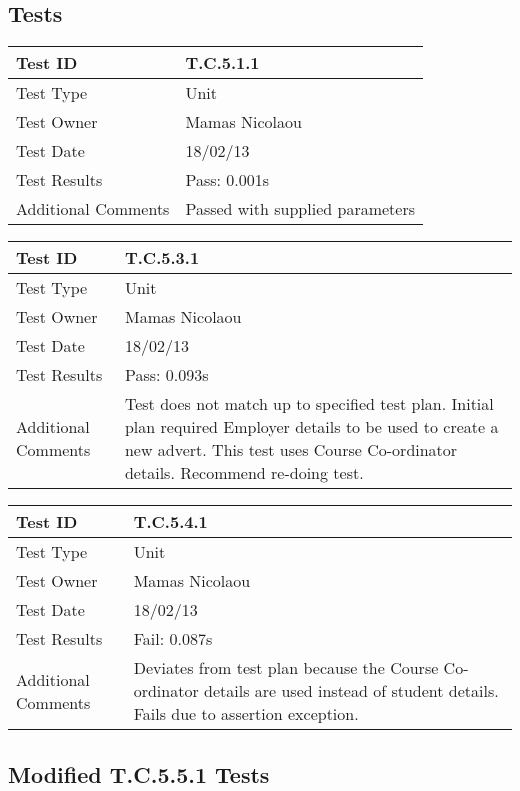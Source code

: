 \documentclass{l3deliverable}
\begin{document}
\subsection{Tests}

\begin{tabular}{|p{2cm}|p{12cm}|}
\hline
Test ID & T.C.5.1.1\\
\hline
Test Type & Unit\\
\hline
Test Owner  & Mamas Nicolaou\\
\hline
Test Date & 18/02/13\\
\hline
Test Results & Pass: 0.001s\\
\hline
Additional Comments & Passed with supplied parameters\\
\hline
\end{tabular}

\vspace{4 mm}

\begin{tabular}{|p{2cm}|p{12cm}|}
\hline
Test ID & T.C.5.3.1\\
\hline
Test Type & Unit\\
\hline
Test Owner  & Mamas Nicolaou\\
\hline
Test Date & 18/02/13\\
\hline
Test Results & Pass: 0.093s\\
\hline
Additional Comments & Test does not match up to specified test plan. Initial plan required Employer details to be used to create a new advert. This test uses Course Co-ordinator details. Recommend re-doing test.\\
\hline
\end{tabular}

\vspace{4 mm}

\begin{tabular}{|p{2cm}|p{12cm}|}
\hline
Test ID & T.C.5.4.1\\
\hline
Test Type & Unit\\
\hline
Test Owner  & Mamas Nicolaou\\
\hline
Test Date & 18/02/13\\
\hline
Test Results & Fail: 0.087s\\
\hline
Additional Comments & Deviates from test plan because the Course Co-ordinator details are used instead of student details. Fails due to assertion exception.\\
\hline
\end{tabular}

\subsection{Modified T.C.5.5.1 Tests}
\end{document}
